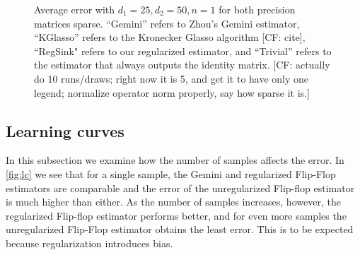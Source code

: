 \documentclass[aos]{imsart}
\theoremstyle{definition}
\numberwithin{equation}{section}
\newcommand{\CF}[1]{{\color{purple}[CF: #1]}}
\begin{document}
\begin{figure}
\begin{subfigure}[b]{0.3\textwidth}
     \end{subfigure}
\caption{Average error with $d_1 = 25, d_2 = 50, n = 1$ for both precision matrices sparse. ``Gemini'' refers to Zhou's Gemini estimator, ``KGlasso'' refers to the Kronecker Glasso algorithm \CF{cite}, ``RegSink" refers to our regularized estimator, and ``Trivial'' refers to the estimator that always outputs the identity matrix. \CF{actually do 10 runs/draws; right now it is 5, and get it to have only one legend; normalize operator norm properly, say how sparse it is.}}\label{fig:sparse-ii}
\end{figure}

\subsection{Learning curves}

In this subsection we examine how the number of samples affects the error. In \cref{fig:lc} we see that for a single sample, the Gemini and regularized Flip-Flop estimators are comparable and the error of the unregularized Flip-flop estimator is much higher than either. As the number of samples increases, however, the regularized Flip-flop estimator performs better, and for even more samples the unregularized Flip-Flop estimator obtains the least error. This is to be expected because regularization introduces bias.
\end{document}
